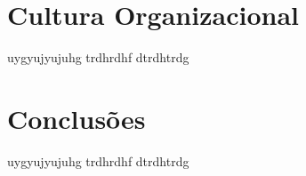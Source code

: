 \section{Cultura Organizacional}
\begin{frame}
uygyujyujuhg
trdhrdhf
dtrdhtrdg


\end{frame}

\section{Conclusões}
\begin{frame}
uygyujyujuhg
trdhrdhf
dtrdhtrdg


\end{frame}


